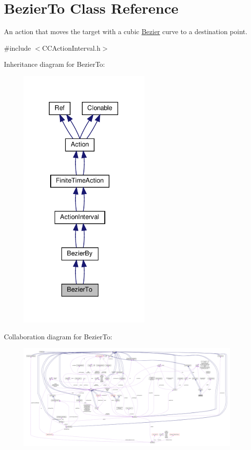 \hypertarget{classBezierTo}{}\section{Bezier\+To Class Reference}
\label{classBezierTo}


An action that moves the target with a cubic \hyperlink{structBezier}{Bezier} curve to a destination point.  




{\ttfamily \#include $<$C\+C\+Action\+Interval.\+h$>$}



Inheritance diagram for Bezier\+To\+:
\nopagebreak
\begin{figure}[H]
\begin{center}
\leavevmode
\includegraphics[width=186pt]{classBezierTo__inherit__graph}
\end{center}
\end{figure}


Collaboration diagram for Bezier\+To\+:
\nopagebreak
\begin{figure}[H]
\begin{center}
\leavevmode
\includegraphics[width=350pt]{classBezierTo__coll__graph}
\end{center}
\end{figure}
